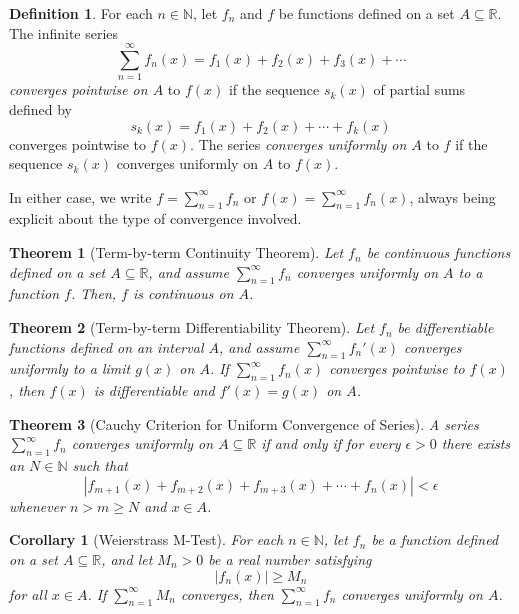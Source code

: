 \documentclass{amsart}
\newtheorem*{theorem}{Theorem}
\newtheorem*{corollary}{Corollary}
\theoremstyle{definition}
\newtheorem*{definition}{Definition}
\newcommand{\N}{\mathbb{N}}
\newcommand{\R}{\mathbb{R}}
\newcommand{\abs}[1]{|#1|}
\begin{document}
\begin{definition}
  For each $n \in \N$, let $f_n$ and $f$ be functions defined on a set $A
  \subseteq \R$. The infinite series
  \[
    \sum_{n=1}^\infty f_n(x) = f_1(x) + f_2(x) + f_3(x) + \cdots
  \]
  \emph{converges pointwise on $A$} to $f(x)$ if the sequence $s_k(x)$ of
  partial sums defined by
  \[
    s_k(x) = f_1(x) + f_2(x) + \cdots + f_k(x)
  \]
  converges pointwise to $f(x)$. The series \emph{converges uniformly on $A$} to
  $f$ if the sequence $s_k(x)$ converges uniformly on $A$ to $f(x)$.

  In either case, we write $f = \sum_{n=1}^\infty f_n$ or $f(x) =
  \sum_{n=1}^\infty f_n(x)$, always being explicit about the type of convergence
  involved.
\end{definition}

\begin{theorem}[Term-by-term Continuity Theorem]
  Let $f_n$ be continuous functions defined on a set $A \subseteq \R$, and
  assume $\sum_{n=1}^\infty f_n$ converges uniformly on $A$ to a function $f$.
  Then, $f$ is continuous on $A$.
\end{theorem}

\begin{theorem}[Term-by-term Differentiability Theorem]
  Let $f_n$ be differentiable functions defined on an interval $A$, and assume
  $\sum_{n=1}^\infty f_n'(x)$ converges uniformly to a limit $g(x)$ on $A$. If
  $\sum_{n=1}^\infty f_n(x)$ converges pointwise to $f(x)$, then $f(x)$ is
  differentiable and $f'(x) = g(x)$ on $A$.
\end{theorem}

\begin{theorem}[Cauchy Criterion for Uniform Convergence of Series]
  A series $\sum_{n=1}^\infty f_n$ converges uniformly on $A \subseteq \R$ if
  and only if for every $\epsilon > 0$ there exists an $N \in \N$ such that
  \[
    \abs{f_{m+1}(x) + f_{m+2}(x) + f_{m+3}(x) + \cdots + f_n(x)} < \epsilon
  \]
  whenever $n > m \ge N$ and $x \in A$.
\end{theorem}

\begin{corollary}[Weierstrass M-Test]
  For each $n \in \N$, let $f_n$ be a function defined on a set $A \subseteq
  \R$, and let $M_n > 0$ be a real number satisfying
  \[
    \abs{f_n(x)} \ge M_n
  \]
  for all $x \in A$. If $\sum_{n=1}^\infty M_n$ converges, then
  $\sum_{n=1}^\infty f_n$ converges uniformly on $A$.
\end{corollary}
\end{document}
